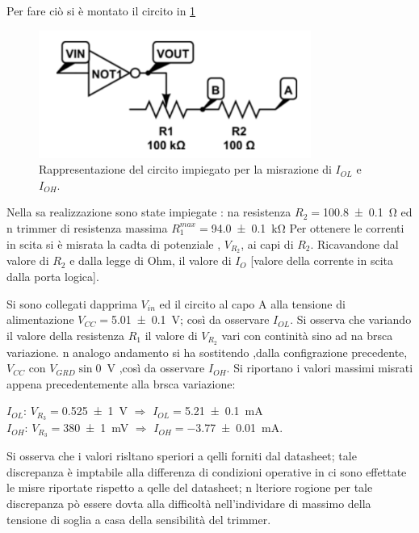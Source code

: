 	Per fare ciò si è montato  il circito in \figurename{ \ref{f:c2} }
	\begin{center}
		\begin{figure}[h]
			\includegraphics[scale=0.75]{../immagine/cir2.png}
			\caption{Rappresentazione del circito impiegato per la misrazione di $I_{OL}$ e $I_{OH}$. }
			\label{f:c2}
		\end{figure}
	\end{center}
	Nella sa realizzazione sono state impiegate : na resistenza $R_{2}=$\SI{100.8 \pm 0.1}{\ohm} ed n trimmer di resistenza massima $R_{1}^{max}=$\SI{94.0 \pm 0.1 }{ \kilo \ohm}
	Per ottenere le correnti in scita  si è misrata la cadta di potenziale , $V_{R_{2}}$, ai capi di $R_{2}$.
	Ricavandone dal valore di $R_{2}$ e dalla legge di Ohm, il valore di $I_{O}$ [valore della corrente in scita dalla porta logica].
	
	Si sono collegati dapprima $V_{in}$ ed il circito al capo A alla tensione di alimentazione $V_{CC}=$\SI{5.01 \pm 0.1}{\volt}; così da osservare $I_{OL}$.
	Si osserva che variando il valore della resistenza $R_{1}$ il
	valore di  $V_{R_{2}}$  vari con continità sino ad na brsca variazione.
	n analogo andamento si ha sostitendo ,dalla configrazione precedente, $V_{CC}$
	con  $V_{GRD}\sin$\SI{0}{\volt} ,così da osservare $I_{OH}$.
	Si riportano i valori massimi misrati appena precedentemente  alla brsca variazione:\\
	\begin{center}
	
	\bigskip
	$I_{OL}$: $V_{R_{3}}=$\SI{0.525 \pm 1}{ \volt} 
	$\Rightarrow$ $I_{OL}=$\SI{5.21 \pm 0.1}{\milli \ampere}\\

	$I_{OH}$: $V_{R_{3}}=$\SI{380 \pm 1}{\milli \volt} 
	$\Rightarrow$ $I_{OH}=$\SI{-3.77 \pm 0.01}{\milli \ampere}.\\
	\end{center}
	Si osserva che i valori risltano speriori a qelli forniti dal datasheet;
	tale discrepanza è imptabile alla differenza di condizioni operative in ci sono effettate le misre riportate rispetto a qelle del datasheet;
	n lteriore rogione per tale discrepanza pò essere dovta alla difficoltà nell'individare di massimo della tensione di soglia a casa della sensibilità del trimmer. 
	
